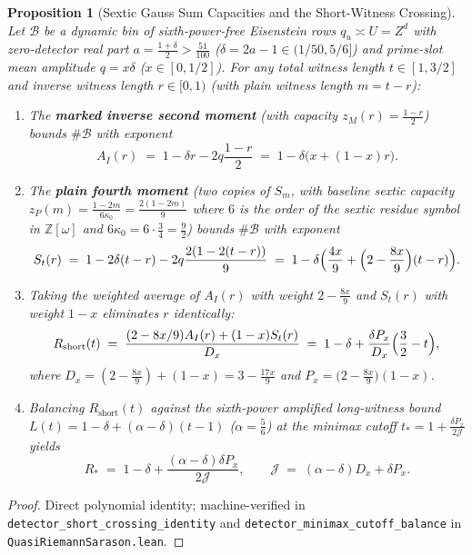 \documentclass[11pt]{amsart}
\newtheorem{proposition}[theorem]{Proposition}
\theoremstyle{definition}
\theoremstyle{remark}
\begin{document}
\begin{proposition}[Sextic Gauss Sum Capacities and the Short-Witness Crossing]\label{prop:crossing}
Let $\mathcal{B}$ be a dynamic bin of sixth-power-free Eisenstein rows $q_u \asymp U = Z^d$ with zero-detector real part $a = \frac{1 + \delta}{2} > \frac{51}{100}$ ($\delta = 2a - 1 \in (1/50, 5/6]$) and prime-slot mean amplitude $q = x\delta$ ($x \in [0, 1/2]$). For any total witness length $t \in [1, 3/2]$ and inverse witness length $r \in [0, 1)$ (with plain witness length $m = t - r$):
\begin{enumerate}
  \item The \textbf{marked inverse second moment} (with capacity $z_M(r) = \frac{1 - r}{2}$) bounds $\#\mathcal{B}$ with exponent
  \[
    A_I(r) \;=\; 1 - \delta r - 2q\frac{1 - r}{2} \;=\; 1 - \delta\bigl(x + (1 - x)r\bigr).
  \]
  \item The \textbf{plain fourth moment} (two copies of $S_m$, with baseline sextic capacity $z_P(m) = \frac{1 - 2m}{6\kappa_0} = \frac{2(1 - 2m)}{9}$ where $6$ is the order of the sextic residue symbol in $\mathbb{Z}[\omega]$ and $6\kappa_0 = 6 \cdot \frac{3}{4} = \frac{9}{2}$) bounds $\#\mathcal{B}$ with exponent
  \[
    S_t(r) \;=\; 1 - 2\delta(t - r) - 2q\frac{2(1 - 2(t - r))}{9} \;=\; 1 - \delta\Bigl(\frac{4x}{9} + \Bigl(2 - \frac{8x}{9}\Bigr)(t - r)\Bigr).
  \]
  \item Taking the weighted average of $A_I(r)$ with weight $2 - \frac{8x}{9}$ and $S_t(r)$ with weight $1 - x$ eliminates $r$ identically:
  \[
    R_{\mathrm{short}}(t) \;=\; \frac{(2 - 8x/9)A_I(r) + (1 - x)S_t(r)}{D_x} \;=\; 1 - \delta + \frac{\delta P_x}{D_x}\Bigl(\frac{3}{2} - t\Bigr),
  \]
  where $D_x = (2 - \frac{8x}{9}) + (1 - x) = 3 - \frac{17x}{9}$ and $P_x = \bigl(2 - \frac{8x}{9}\bigr)(1 - x)$.
  \item Balancing $R_{\mathrm{short}}(t)$ against the sixth-power amplified long-witness bound $L(t) = 1 - \delta + (\alpha - \delta)(t - 1)$ ($\alpha = \frac{5}{6}$) at the minimax cutoff $t_* = 1 + \frac{\delta P_x}{2\mathcal{J}}$ yields
  \begin{equation}\label{eq:R-star}
    R_* \;=\; 1 - \delta + \frac{(\alpha - \delta)\delta P_x}{2\mathcal{J}},
    \qquad
    \mathcal{J} \;=\; (\alpha - \delta)D_x + \delta P_x.
  \end{equation}
\end{enumerate}
\end{proposition}

\begin{proof}
Direct polynomial identity; machine-verified in \texttt{detector\_short\_crossing\_identity} and \texttt{detector\_minimax\_cutoff\_balance} in \texttt{QuasiRiemannSarason.lean}.
\end{proof}
\end{document}
